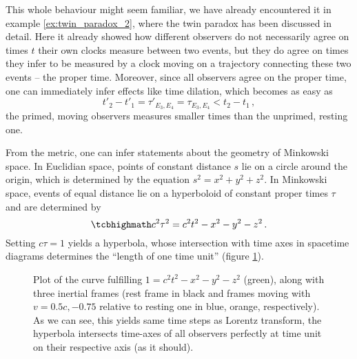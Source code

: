 \begin{ex}
This whole behaviour might seem familiar, we have already encountered it in example \ref{ex:twin_paradox_2}, where the twin paradox has been discussed in detail. Here it already showed how different observers do not necessarily agree on times $t$ their own clocks measure between two events, but they do agree on times they infer to be measured by a clock moving on a trajectory connecting these two events -- the proper time. Moreover, since all observers agree on the proper time, one can immediately infer effects like time dilation, which becomes as easy as
\begin{equation*}
t'_2 - t'_1 = \tau'_{E_3, E_4} = \tau_{E_3, E_4} < t_2 - t_1 \, ,
\end{equation*}
the primed, moving observers measures smaller times than the unprimed, resting one.
\end{ex}

From the metric, one can infer statements about the geometry of Minkowski space. In Euclidian space, points of constant distance $s$ lie on a circle around the origin, which is determined by the equation $s^2 = x^2 + y^2 + z^2$. In Minkowski space, events of equal distance lie on a hyperboloid of constant proper times $\tau$ and are determined by
\begin{equation}\label{eq:eichhyperbel}
\eqbox{
c^2 \tau^2 = c^2 t^2 - x^2 - y^2 - z^2
} \, .
\end{equation}
Setting $c \tau = 1$ yields a hyperbola, whose intersection with time axes in spacetime diagrams determines the \enquote{length of one time unit} (figure \ref{fig:minkowski_with_eichhyperbel}).


\begin{figure}
	\centering


	\caption{Plot of the curve fulfilling $1 = c^2 t^2 - x^2 - y^2 - z^2$ (green), along with three inertial frames (rest frame in black and frames moving with $v = 0.5 c, -0.75$ relative to resting one in blue, orange, respectively).\\
	As we can see, this yields same time steps as Lorentz transform, the hyperbola intersects time-axes of all observers perfectly at time unit on their respective axis (as it should).}
	\label{fig:minkowski_with_eichhyperbel}
\end{figure}



